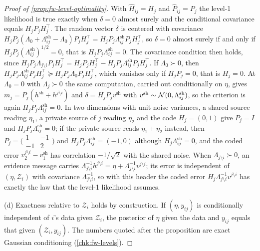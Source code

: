 \begin{proof}[Proof of \cref{prop:fw-level-optimality}]
With $\hat H_{ij}=H_j$ and $\hat P_{ij}=P_j$ the level-1 likelihood is true exactly when $\delta=0$ almost surely and the conditional covariance equals $H_jP_jH_j^\top$. The random vector $\delta$ is centered with covariance $H_jP_j(\Lambda_0+\Lambda^{\mathrm{sh}}_{ij}-\Lambda_0)P_jH_j^\top=H_jP_j\Lambda^{\mathrm{sh}}_{ij}P_jH_j^\top$, so $\delta=0$ almost surely if and only if $H_jP_j(\Lambda^{\mathrm{sh}}_{ij})^{1/2}=0$, that is $H_jP_j\Lambda^{\mathrm{sh}}_{ij}=0$. The covariance condition then holds, since $H_jP_j\Lambda_{j\setminus i}P_jH_j^\top=H_jP_jH_j^\top-H_jP_j\Lambda^{\mathrm{sh}}_{ij}P_jH_j^\top$. If $\Lambda_0\succ0$, then $H_jP_j\Lambda^{\mathrm{sh}}_{ij}P_jH_j^\top\succeq H_jP_j\Lambda_0P_jH_j^\top$, which vanishes only if $H_jP_j=0$, that is $H_j=0$. At $\Lambda_0=0$ with $\Lambda_j\succ0$ the same computation, carried out conditionally on $\eta$, gives $m_j=P_j(h^{\mathrm{sh}}+h^{j\setminus i})$ and $\delta=H_jP_jv^{\mathrm{sh}}$ with $v^{\mathrm{sh}}\sim\mathcal{N}(0,\Lambda^{\mathrm{sh}}_{ij})$, so the criterion is again $H_jP_j\Lambda^{\mathrm{sh}}_{ij}=0$. In two dimensions with unit noise variances, a shared source reading $\eta_1$, a private source of $j$ reading $\eta_2$ and the code $H_j=(0,1)$ give $P_j=I$ and $H_jP_j\Lambda^{\mathrm{sh}}_{ij}=0$; if the private source reads $\eta_1+\eta_2$ instead, then $P_j=\bigl(\begin{smallmatrix}1&-1\\-1&2\end{smallmatrix}\bigr)$ and $H_jP_j\Lambda^{\mathrm{sh}}_{ij}=(-1,0)$ although $H_j\Lambda^{\mathrm{sh}}_{ij}=0$, and the coded error $v^{j\setminus i}_2-v^{\mathrm{sh}}_1$ has correlation $-1/\sqrt2$ with the shared noise. When $\Lambda_{j\setminus i}\succ0$, an evidence message carries $\Lambda_{j\setminus i}^{-1}h^{j\setminus i}=\eta+\Lambda_{j\setminus i}^{-1}v^{j\setminus i}$; its error is independent of $(\eta,\mathcal Z_i)$ with covariance $\Lambda_{j\setminus i}^{-1}$, so with this header the coded error $H_j\Lambda_{j\setminus i}^{-1}v^{j\setminus i}$ has exactly the law that the level-1 likelihood assumes.

(d) Exactness relative to $\mathcal Z_i$ holds by construction. If $(\eta,y_{ij})$ is conditionally independent of $i$'s data given $\mathcal Z_i$, the posterior of $\eta$ given the data and $y_{ij}$ equals that given $(\mathcal Z_i,y_{ij})$. The numbers quoted after the proposition are exact Gaussian conditioning (\cref{chk:fw-levels}).
\end{proof}

